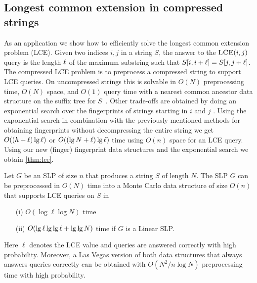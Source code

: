 \subsection{Longest common extension in compressed strings}
As an application we show how to efficiently solve the longest common extension problem (LCE).
Given two indices $i, j$ in a string $S$, the answer to the $\textsc{LCE}(i, j)$ query is the length $\ell$ of the maximum substring such that $S[i, i+\ell] = S[j, j+\ell]$. The compressed LCE problem is to preprocess a compressed string to support LCE queries. On uncompressed strings this is solvable in $O(N)$ preprocessing time, $O(N)$ space, and $O(1)$ query time with a nearest common ancestor data structure on the suffix tree for $S$~\cite{harel1984fast}. Other trade-offs are obtained by doing an exponential search over the fingerprints of strings starting in $i$ and $j$ \cite{bille12lce}. Using the exponential search in combination with the previously mentioned methods for obtaining fingerprints without decompressing the entire string we get $O((h+\ell)\lg \ell)$ or $O((\lg N+\ell)\lg \ell)$ time using $O(n)$ space for an LCE query. Using our new (finger) fingerprint data structures and the exponential search we obtain \autoref{thm:lce}.

\begin{theorem}\label{thm:lce}
Let $G$ be an SLP of size $n$ that produces a string $S$ of length $N$. The SLP $G$ can be preprocessed in $O(N)$ time into a Monte Carlo data structure of size $O(n)$ that supports LCE queries on $S$ in
\begin{enumerate}
\item[(i)] $O(\log \ell \log N)$ time
\item[(ii)] $O(\lg \ell \lg\lg \ell + \lg\lg N)$ time if $G$ is a Linear SLP.
\end{enumerate}
Here $\ell$ denotes the LCE value and queries are answered correctly with high probability. Moreover, a Las Vegas version of both data structures that always answers queries correctly can be obtained with
$O(N^2/n \log N)$ preprocessing time with high probability.
\end{theorem}

